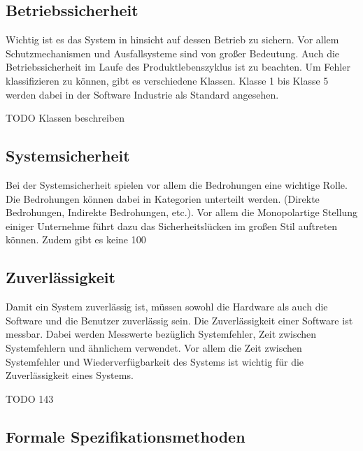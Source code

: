 \subsection{Betriebssicherheit}
Wichtig ist es das System in hinsicht auf dessen Betrieb zu sichern. Vor allem Schutzmechanismen und Ausfallsysteme sind von großer Bedeutung. Auch die Betriebssicherheit im Laufe des Produktlebenszyklus ist zu beachten. Um Fehler klassifizieren zu können, gibt es verschiedene Klassen. Klasse 1 bis Klasse 5 werden dabei in der Software Industrie als Standard angesehen.

TODO Klassen beschreiben

\subsection{Systemsicherheit}
Bei der Systemsicherheit spielen vor allem die Bedrohungen eine wichtige Rolle. Die Bedrohungen können dabei in Kategorien unterteilt werden. (Direkte Bedrohungen, Indirekte Bedrohungen, etc.). Vor allem die Monopolartige Stellung einiger Unternehme führt dazu das Sicherheitslücken im großen Stil auftreten können. Zudem gibt es keine 100%

\subsection{Zuverlässigkeit}
Damit ein System zuverlässig ist, müssen sowohl die Hardware als auch die Software und die Benutzer zuverlässig sein. Die Zuverlässigkeit einer Software ist messbar. Dabei werden Messwerte bezüglich Systemfehler, Zeit zwischen Systemfehlern und ähnlichem verwendet. Vor allem die Zeit zwischen Systemfehler und Wiederverfügbarkeit des Systems ist wichtig für die Zuverlässigkeit eines Systems.

TODO 143

\subsection{Formale Spezifikationsmethoden}